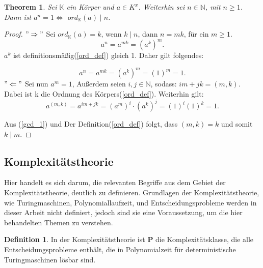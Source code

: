 \documentclass[12pt,oneside]{article}
\newtheorem{theorem}{Theorem}[section]
\theoremstyle{remark}
\theoremstyle{definition}
\newtheorem{definition}{Definition}[section]
\begin{document}
\smallskip

\begin{theorem}
Sei $\mathbb{K}$ ein Körper und $a \in K^x$. Weiterhin sei $ n \in \mathbb{N}$, mit $n \geq 1$. Dann ist $a^n = 1 \Leftrightarrow	 $ $ord_{\mathbb{K}}(a) \mid n$. 
\end{theorem}

\smallskip

\begin{proof}
$"\Rightarrow"$\newline
Sei $ord_{\mathbb{K}}(a) = k $, wenn $k \mid n$, dann $n = mk$, für ein $ m \geq 1$.
\begin{equation}
    a^n = a^{mk} = (a^k)^m. 
\end{equation}
$a^k$ ist definitionsmäßig(\ref{ord_def}) gleich 1. Daher gilt folgendes:

\begin{equation}
    a^n = a^{mk} = (a^k)^m = (1)^m = 1.
\end{equation}
$"\Leftarrow"$\newline
Sei nun $a^m = 1$, Außerdem seien $i,j \in \mathbb{N}$, sodass:\newline
$im + jk = (m,k)$. Dabei ist k die Ordnung des Körpers(\ref{ord_def}).\newline\newline
Weiterhin gilt: 
\begin{equation}\label{gcd_1}
   a^{(m,k)} = a^{im + jk} = (a^m)^i \cdot (a^k)^j = (1)^i (1)^k = 1.
\end{equation}

Aus (\ref{gcd_1}) und Der Definition(\ref{ord_def}) folgt, dass $(m,k) = k$ und somit $k \mid m$.
\end{proof}

\smallskip

\subsection{Komplexitätstheorie}

Hier handelt es sich darum, die relevanten Begriffe aus dem Gebiet der Komplexitätstheorie, deutlich zu definieren. Grundlagen der Komplexitätstheorie, wie Turingmaschinen, Polynomiallaufzeit, und Entscheidungsprobleme werden in dieser Arbeit nicht definiert, jedoch sind sie eine Voraussetzung, um die hier behandelten Themen zu verstehen.   

\begin{definition}
In der Komplexitätstheorie ist \textbf{P} die Komplexitätsklasse, die alle Entscheidungsprobleme enthält, die in Polynomialzeit für deterministische Turingmaschinen lösbar sind. 
\end{definition}
\end{document}
